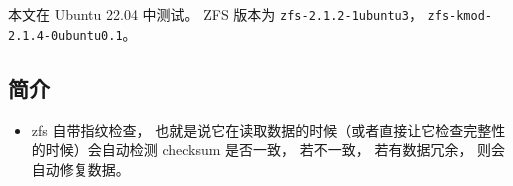 

本文在 Ubuntu 22.04 中测试。 ZFS 版本为 \verb`zfs-2.1.2-1ubuntu3`， \verb`zfs-kmod-2.1.4-0ubuntu0.1`。

\subsection{简介}
\begin{itemize}
\item zfs 自带指纹检查， 也就是说它在读取数据的时候（或者直接让它检查完整性的时候）会自动检测 checksum 是否一致， 若不一致， 若有数据冗余， 则会自动修复数据。
\end{itemize}

